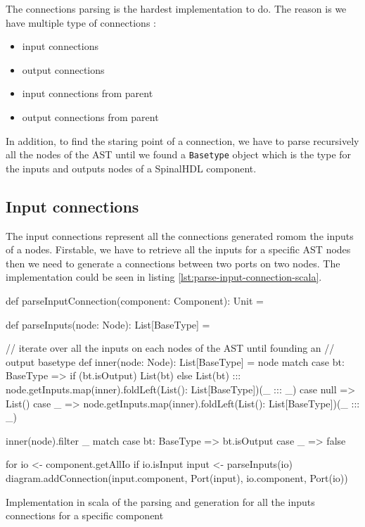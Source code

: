 The connections parsing is the hardest implementation to do. The reason is we
have multiple type of connections :
\begin{itemize}
\item input connections
\item output connections
\item input connections from parent
\item output connections from parent
\end{itemize}

In addition, to find the staring point of a connection, we have to parse
recursively all the nodes of the AST until we found a \verb|Basetype| object
which is the type for the inputs and outputs nodes of a SpinalHDL component.

\subsection{Input connections}
\label{sec:input-connections}

The input connections represent all the connections generated romom the inputs of a
nodes. Firstable, we have to retrieve all the inputs for a specific AST nodes
then we need to generate a connections between two ports on two nodes. The
implementation could be seen in listing \ref{lst:parse-input-connection-scala}.

\begin{listing}[H]
  \centering
  \begin{scalacode}
  def parseInputConnection(component: Component): Unit = {
      
    def parseInputs(node: Node): List[BaseType] = {
      
      // iterate over all the inputs on each nodes of the AST until founding an
      // output basetype
      def inner(node: Node): List[BaseType] = node match {
        case bt: BaseType =>
          if (bt.isOutput) List(bt)
          else List(bt) ::: node.getInputs.map(inner).foldLeft(List(): List[BaseType])(_ ::: _)
        case null => List()
        case _ => node.getInputs.map(inner).foldLeft(List(): List[BaseType])(_ ::: _)
      }

      inner(node).filter {
        _ match {
          case bt: BaseType => bt.isOutput
          case _ => false
        }
      }
    }

    for {
      io <- component.getAllIo
      if io.isInput
      input <- parseInputs(io)
    } {
      diagram.addConnection(input.component, Port(input), io.component, Port(io))
    }
  }
  \end{scalacode}
  \caption[Parsing and generation of the inputs connections]{Implementation in
    scala of the parsing and generation for all the inputs connections for a
    specific component}
  \label{lst:parse-input-connection-scala}
\end{listing}

